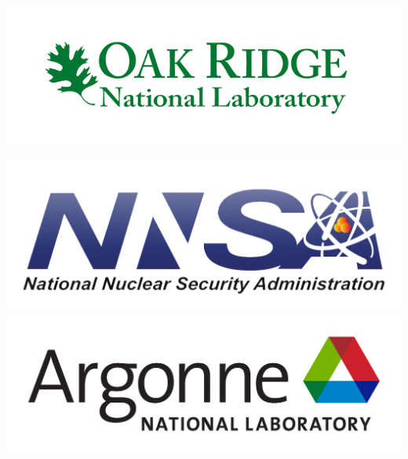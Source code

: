 {\begin{center}
\begin{minipage}{0.7\linewidth}
\begin{tcolorbox}[colback=white, colframe=black, width=\linewidth, height=.275\linewidth, boxrule=1pt]
\begin{center}
\begin{minipage}{.3\linewidth}
\begin{center}
                        \includegraphics[width = \linewidth]{img/ornl.png}
                    \end{center}
                \end{minipage}
                \begin{minipage}{.3\linewidth}
                    \begin{center}
                        \includegraphics[width = \linewidth]{img/nnsa.png}
                        \newline\vspace{-1.5em}
                        \includegraphics[width = \linewidth]{img/anl.png}
                    \end{center}
                \end{minipage}
                \begin{minipage}{.3\linewidth}
                    \begin{center}

\end{center}
\end{minipage}
\end{center}
\end{tcolorbox}
\end{minipage}
\end{center}}
